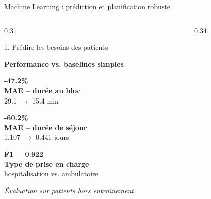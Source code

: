 \documentclass[aspectratio=169,11pt]{beamer}
\begin{document}
\begin{frame}{Machine Learning : prédiction et planification robuste}

\vspace{-0.45cm}

\begin{columns}[T,onlytextwidth]

\begin{column}{0.31\textwidth}

\begin{block}{1. Prédire les besoins des patients}
\scriptsize

\textbf{Performance vs. baselines simples}

\vspace{0.18cm}

{\Large\color{mcmPrimary}\textbf{-47.2\%}}\\
\textbf{MAE -- durée au bloc}\\
29.1 $\rightarrow$ 15.4 min

\vspace{0.2cm}

{\Large\color{mcmPrimary}\textbf{-60.2\%}}\\
\textbf{MAE -- durée de séjour}\\
1.107 $\rightarrow$ 0.441 jours

\vspace{0.25cm}

{\Large\color{mcmPrimary}\textbf{F1 = 0.922}}\\
\textbf{Type de prise en charge}\\
hospitalisation vs. ambulatoire

\vspace{0.30cm}

\textit{Évaluation sur patients hors entraînement}

\end{block}

\end{column}


\begin{column}{0.34\textwidth}


\end{column}
\end{columns}
\end{frame}
\end{document}
